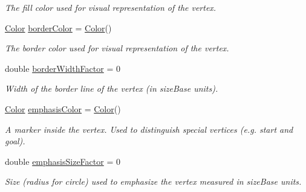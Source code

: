 \begin{DoxyCompactItemize}
\begin{DoxyCompactList}\small\item\em The fill color used for visual representation of the vertex. \end{DoxyCompactList}\item 
\hyperlink{colors_8h_ab87bacfdad76e61b9412d7124be44c1c}{Color} \hyperlink{structVertexStyle_a97e5230e72990a97558a020a5d4ceebc}{border\+Color} = \hyperlink{colors_8h_ab87bacfdad76e61b9412d7124be44c1c}{Color}()\hypertarget{structVertexStyle_a97e5230e72990a97558a020a5d4ceebc}{}\label{structVertexStyle_a97e5230e72990a97558a020a5d4ceebc}

\begin{DoxyCompactList}\small\item\em The border color used for visual representation of the vertex. \end{DoxyCompactList}\item 
double \hyperlink{structVertexStyle_aa51cd2f62efe98f998ce5fb60cadd02b}{border\+Width\+Factor} = 0\hypertarget{structVertexStyle_aa51cd2f62efe98f998ce5fb60cadd02b}{}\label{structVertexStyle_aa51cd2f62efe98f998ce5fb60cadd02b}

\begin{DoxyCompactList}\small\item\em Width of the border line of the vertex (in size\+Base units). \end{DoxyCompactList}\item 
\hyperlink{colors_8h_ab87bacfdad76e61b9412d7124be44c1c}{Color} \hyperlink{structVertexStyle_ab0a5bda664aec516d7f623ae38444460}{emphasis\+Color} = \hyperlink{colors_8h_ab87bacfdad76e61b9412d7124be44c1c}{Color}()\hypertarget{structVertexStyle_ab0a5bda664aec516d7f623ae38444460}{}\label{structVertexStyle_ab0a5bda664aec516d7f623ae38444460}

\begin{DoxyCompactList}\small\item\em A marker inside the vertex. Used to distinguish special vertices (e.\+g. start and goal). \end{DoxyCompactList}\item 
double \hyperlink{structVertexStyle_a38b0a017ca5848a5945f8fa38227f612}{emphasis\+Size\+Factor} = 0\hypertarget{structVertexStyle_a38b0a017ca5848a5945f8fa38227f612}{}\label{structVertexStyle_a38b0a017ca5848a5945f8fa38227f612}

\begin{DoxyCompactList}\small\item\em Size (radius for circle) used to emphasize the vertex measured in size\+Base units. \end{DoxyCompactList}\end{DoxyCompactItemize}
